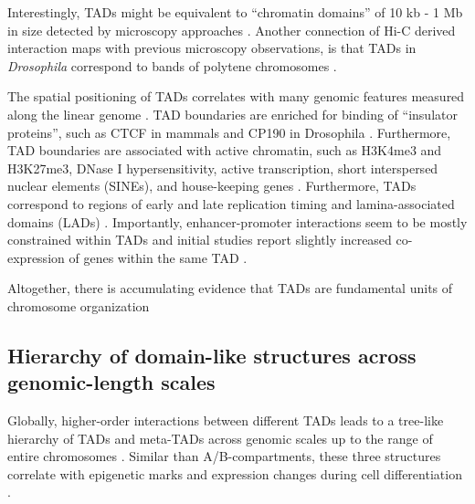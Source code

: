 \documentclass[a4paper,twoside=true,openright,parskip=full,chapterprefix=true,11pt,headings=normal,bibliography=totoc,listof=totoc,titlepage=on,captions=tableabove,draft=false]{scrreprt}
\theoremstyle{definition}
\theoremstyle{definition}
\theoremstyle{definition}
\theoremstyle{remark}
\begin{document}
Interestingly, TADs might be equivalent to ``chromatin domains'' of 10
kb - 1 Mb in size detected by microscopy approaches
\citep{Cremer2010, Gibcus2013}. Another connection of Hi-C derived
interaction maps with previous microscopy observations, is that TADs in
\emph{Drosophila} correspond to bands of polytene chromosomes
\citep{Eagen2015}.

The spatial positioning of TADs correlates with many genomic features
measured along the linear genome \citep{Merkenschlager2016}. TAD
boundaries are enriched for binding of ``insulator proteins'', such as
CTCF in mammals and CP190 in Drosophila \citep{Dixon2012, Sexton2012}.
Furthermore, TAD boundaries are associated with active chromatin, such
as H3K4me3 and H3K27me3, DNase I hypersensitivity, active transcription,
short interspersed nuclear elements (SINEs), and house-keeping genes
\citep{Dixon2012}. Furthermore, TADs correspond to regions of early and
late replication timing \citep{Pope2014, Dileep2015} and
lamina-associated domains (LADs) \citep{Dixon2012}. Importantly,
enhancer-promoter interactions seem to be mostly constrained within TADs
\citep{Shen2012, Ghavi-helm2014, Symmons2014} and initial studies report
slightly increased co-expression of genes within the same TAD
\citep{Nora2012}.

Altogether, there is accumulating evidence that TADs are fundamental
units of chromosome organization \citep{Dixon2016}

\hypertarget{hierarchy-of-domain-like-structures-across-genomic-length-scales}{%
\subsection{Hierarchy of domain-like structures across genomic-length
scales}\label{hierarchy-of-domain-like-structures-across-genomic-length-scales}}

Globally, higher-order interactions between different TADs leads to a
tree-like hierarchy of TADs and meta-TADs across genomic scales up to
the range of entire chromosomes \citep{Fraser2015}. Similar than
A/B-compartments, these three structures correlate with epigenetic marks
and expression changes during cell differentiation \citep{Fraser2015}.
\end{document}
